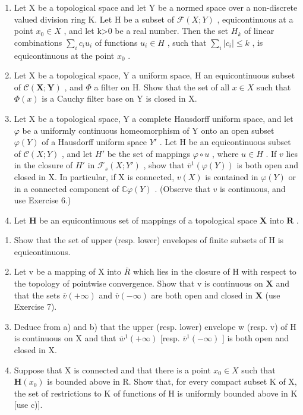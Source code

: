 \begin{enumerate}
\def\labelenumi{\arabic{enumi})}
\setcounter{enumi}{4}
\item
  Let X be a topological space and let Y be a normed space over a non-discrete valued division ring K. Let H be a subset of \(\mathcal{F}(X;Y)\) , equicontinuous at a point \(x_{0}\in X\) , and let k\textgreater0 be a real number. Then the set \(H_{k}\) of linear combinations \(\sum_{i}c_{i}u_{i}\) of functions \(u_{i}\in H\) , such that \(\sum_{i}|c_{i}|\leqslant k\) , is equicontinuous at the point \(x_{0}\) .
\item
  Let X be a topological space, Y a uniform space, H an equicontinuous subset of \(\mathcal{C}(\mathbf{X};\mathbf{Y})\) , and \(\Phi\) a filter on H. Show that the set of all \(x\in X\) such that \(\Phi(x)\) is a Cauchy filter base on Y is closed in X.
\item
  Let X be a topological space, Y a complete Hausdorff uniform space, and let \(\varphi\) be a uniformly continuous homeomorphism of Y onto an open subset \(\varphi(Y)\) of a Hausdorff uniform space \(Y'\) . Let H be an equicontinuous subset of \(\mathcal{C}(X; Y)\) , and let \(H'\) be the set of mappings \(\varphi \circ u\) , where \(u \in H\) . If \(v\) lies in the closure of \(H'\) in \(\mathcal{F}_s(X; Y')\) , show that \(\overline{v}^{1}(\varphi(Y))\) is both open and closed in X. In particular, if X is connected, \(v(X)\) is contained in \(\varphi(Y)\) or in a connected component of \(\mathbb{C}\varphi(Y)\) . (Observe that \(v\) is continuous, and use Exercise 6.)
\item
  Let \(\mathbf{H}\) be an equicontinuous set of mappings of a topological space \(\mathbf{X}\) into \(\mathbf{R}\) .
\end{enumerate}

\begin{enumerate}
\def\labelenumi{\alph{enumi})}
\item
  Show that the set of upper (resp. lower) envelopes of finite subsets of H is equicontinuous.
\item
  Let v be a mapping of X into \(\overline{R}\) which lies in the closure of H with respect to the topology of pointwise convergence. Show that v is continuous on \(\mathbf{X}\) and that the sets \(\overline{v} (+\infty)\) and \(\overline{v} (-\infty)\) are both open and closed in \(\mathbf{X}\) (use Exercise 7).
\item
  Deduce from a) and b) that the upper (resp. lower) envelope w (resp. v) of H is continuous on X and that \(\overline{w}^{1}(+\infty)\) {[}resp. \(\overline{v}^{1}(-\infty)\) {]} is both open and closed in X.
\item
  Suppose that X is connected and that there is a point \(x_{0} \in X\) such that \(\mathbf{H}(x_{0})\) is bounded above in R. Show that, for every compact subset K of X, the set of restrictions to K of functions of H is uniformly bounded above in K {[}use c){]}.
\end{enumerate}

